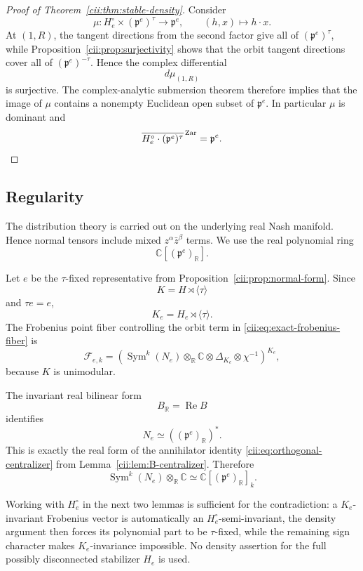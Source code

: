 \documentclass[11pt,reqno]{amsart}
\numberwithin{equation}{section}
\theoremstyle{definition}
\theoremstyle{remark}
\newcommand{\C}{\mathbb C}
\newcommand{\R}{\mathbb R}
\newcommand{\Sym}{\operatorname{Sym}}
\begin{document}
\begin{proof}[Proof of Theorem~\ref{cii:thm:stable-density}]
Consider
\[
\mu:
H_e^\circ\times(\mathfrak p^e)^\tau
\longrightarrow
\mathfrak p^e,
\qquad
(h,x)\longmapsto h\cdot x.
\]
At \((1,R)\), the tangent directions from the second factor give all of
\((\mathfrak p^e)^\tau\), while
Proposition~\ref{cii:prop:surjectivity} shows that the orbit tangent directions
cover all of \((\mathfrak p^e)^{-\tau}\).  Hence the complex differential
\[
d\mu_{(1,R)}
\]
is surjective.  The complex-analytic submersion theorem therefore implies
that the image of \(\mu\) contains a nonempty Euclidean open subset of
\(\mathfrak p^e\).  In particular \(\mu\) is dominant and
\[
\overline{
H_e^\circ\cdot(\mathfrak p^e)^\tau
}^{\,\mathrm{Zar}}
=
\mathfrak p^e.\qedhere
\]
\end{proof}


\subsection{Regularity}\label{cii:sec:regularity}

The distribution theory is carried out on the underlying real Nash
manifold.  Hence normal tensors include mixed
\(z^\alpha\bar z^\beta\) terms.  We use the real polynomial ring
\[
\C[(\mathfrak p^e)_{\R}].
\]

Let \(e\) be the \(\tau\)-fixed representative from
Proposition~\ref{cii:prop:normal-form}.  Since
\[
K=H\rtimes\langle\tau\rangle
\]
and \(\tau e=e\),
\[
K_e=H_e\rtimes\langle\tau\rangle.
\]
The Frobenius point fiber controlling the orbit term in
\eqref{cii:eq:exact-frobenius-fiber} is
\begin{equation}\label{cii:eq:K-fiber}
\mathcal F_{e,k}
=
\left(
\Sym^k(N_e)\otimes_{\R}\C
\otimes\Delta_{K_e}
\otimes\chi^{-1}
\right)^{K_e},
\end{equation}
because \(K\) is unimodular.

The invariant real bilinear form
\[
  B_{\R}=\operatorname{Re}B
\]
identifies
\[
  N_e\simeq((\mathfrak p^e)_{\R})^*.
\]
This is exactly the real form of the annihilator identity
\eqref{cii:eq:orthogonal-centralizer} from
Lemma~\ref{cii:lem:B-centralizer}.
Therefore
\begin{equation}\label{cii:eq:real-poly}
\Sym^k(N_e)\otimes_{\R}\C
\simeq
\C[(\mathfrak p^e)_{\R}]_k.
\end{equation}

Working with $H_e^\circ$ in the next two lemmas is sufficient for the
contradiction: a $K_e$-invariant Frobenius vector is automatically an
$H_e^\circ$-semi-invariant, the density argument then forces its polynomial
part to be $\tau$-fixed, while the remaining sign character makes
$K_e$-invariance impossible.  No density assertion for the full possibly
disconnected stabilizer $H_e$ is used.
\end{document}
